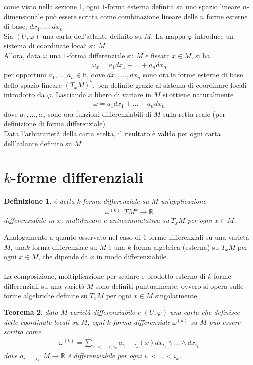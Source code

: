 \documentclass[twoside, 11pt]{amsbook}
\makeatletter
\newcommand{\0}{{(0)}}
\newcommand{\3}{{(3)}}
\theoremstyle{colonplain}
\newtheorem{thm}{Teorema}[chapter]
\theoremstyle{colondefinition}
\newtheorem{defn}[thm]{Definizione}
\theoremstyle{colonremark}
\numberwithin{equation}{chapter}
\renewcommand{\proofname}{Dimostrazione}
\renewenvironment{proof}[1][\proofname]{\par
  \pushQED{\qed}%
  \normalfont \topsep6\p@\@plus6\p@\relax
  \trivlist
  \item[\hskip\labelsep\bfseries #1:]\ignorespaces
}{%
  \popQED\endtrivlist\@endpefalse
}
\makeatother
\begin{document}
\begin{proof} come visto nella sezione 1, ogni $1$-forma esterna definita su uno spazio lineare $n$-dimensionale può essere scritta come combinazione lineare delle $n$ forme esterne di base, $dx_1, \dots, dx_n$. \\
Sia $(U, \varphi)$ una carta dell'atlante definito su $M$. La mappa $\varphi$ introduce un sistema di coordinate locali su $M$. \\
Allora, data $\omega$ una $1$-forma differenziale su $M$ e fissato $x \in M$, si ha 
\begin{align}
    \omega_x = a_1dx_1 + \dots + a_ndx_n
\end{align}
per opportuni $a_1, \dots, a_n \in \mathbb{R}$, dove $dx_1, \dots, dx_n$ sono ora le forme esterne di base dello spazio lineare $(T_xM)^*$, ben definite grazie al sistema di coordinare locali introdotto da $\varphi$. Lasciando $x$ libero di variare in $M$ si ottiene naturalmente 
\begin{align}
   \omega = a_1dx_1 + \dots + a_ndx_n
\end{align}
dove $a_1, \dots, a_n$ sono ora funzioni differenziabili di $M$ sulla retta reale (per definizione di forma differenziale). \\
Data l'arbitrarietà della carta scelta, il risultato è valido per ogni carta dell'atlante definito su $M$. \end{proof}

\section{\texorpdfstring{$k$-forme differenziali}{k-forme differenziali}}
\begin{defn} è detta $k$-\textit{forma differenziale} su $M$ un'applicazione 
\begin{align}
   \omega^{(k)} : TM^k \longrightarrow \mathbb{R} 
\end{align}
differenziabile in $x$, multilineare e anticommutativa su $T_xM$ per ogni $x \in M$.
\end{defn}
Analogamente a quanto osservato nel caso di $1$-forme differenziali su una varietà $M$, una$k$-forma differenziale su $M$ è una $k$-forma algebrica (esterna) su $T_xM$ per ogni $x \in M$, che dipende da $x$ in modo differenziabile. \\ \\
La composizione, moltiplicazione per scalare e prodotto esterno di $k$-forme differenziali su una varietà $M$ sono definiti puntualmente, ovvero si opera sulle forme algebriche definite su $T_xM$ per ogni $x \in M$ singolarmente.
\begin{thm} data $M$ varietà differenziabile e $(U, \varphi)$ una carta che definisce delle coordinate locali su $M$, ogni $k$-forma differenziale $\omega^{(k)}$ su $M$ può essere scritta come
\begin{align}
   \omega^{(k)} = \sum_{i_1 < \dots < i_k} a_{i_1, \dots, i_k}(x)dx_{i_1} \wedge \dots \wedge dx_{i_k} 
\end{align}
dove $a_{i_1, \dots, i_k} : M \longrightarrow \mathbb{R}$ è differenziabile per ogni $i_1 < \dots <i_k$.
\end{thm}
\end{document}
